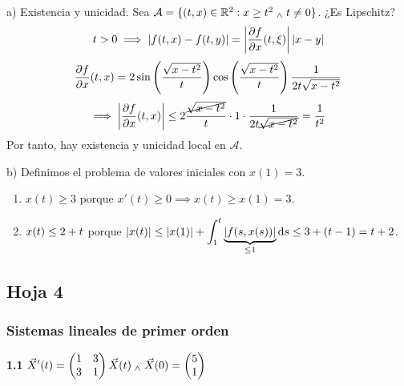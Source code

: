 a) Existencia y unicidad. Sea $\mathcal{A} = \{(t, x) \in \mathbb{R}^2 : x \geq t^2 \; _{\wedge} \; t\ne 0\}$. ¿Es Lipschitz?
\[t > 0 \implies \left|f(t, x) - f(t, y)\right| = \left| \pdv{f}{x} (t, \xi)\right|\left|x-y\right|\]
\[\pdv{f}{x}(t,x) = 2\sin\left(\frac{\sqrt{x-t^2}}{t}\right)\cos\left(\frac{\sqrt{x-t^2}}{t}\right)\frac{1}{2t\sqrt{x-t^2}}\]
\[\implies \left|\pdv{f}{x}(t,x )\right| \leq 2 \frac{\cancel{\sqrt{x-t^2}}}{t} \cdot 1 \cdot \frac{1}{2t\cancel{\sqrt{x-t^2}}} = \frac{1}{t^2}\]
Por tanto, hay existencia y unicidad local en $\mathcal{A}$.

b) Definimos el problema de valores iniciales con $x(1) = 3$.
\begin{enumerate}
	\item $x(t) \geq 3$ porque $x'(t) \geq 0 \implies x(t) \geq x(1) = 3$.
	\item $\displaystyle x(t) \leq 2 + t$ porque $\ds \abs{x(t)} \leq \abs{x(1)} + \int_{1}^{t} \underbrace{\abs{f(s, x(s))}}_{\leq 1} \odif{s} \leq 3 + (t-1) = t+2$.
\end{enumerate}

\subsection{Hoja 4}

\subsubsection{Sistemas lineales de primer orden}

\textbf{1.1} $\displaystyle \vec{X}'(t) = \begin{pmatrix} 1 & 3 \\ 3 & 1 \end{pmatrix} \vec{X}(t) \; _{\wedge} \; \vec{X}(0) = \begin{pmatrix} 5 \\ 1 \end{pmatrix}$

